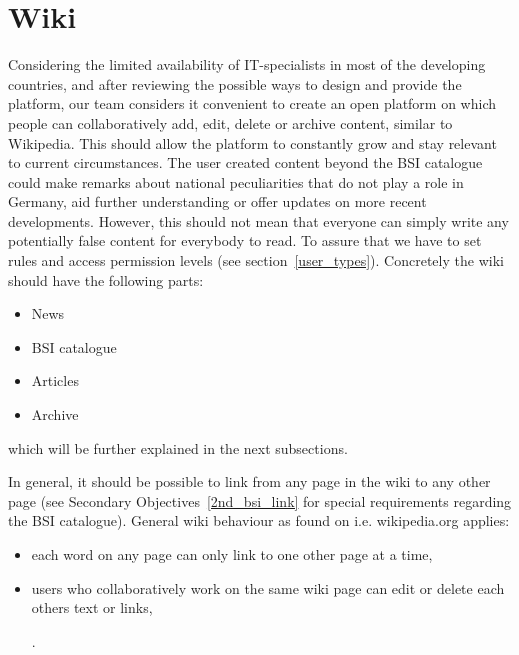 \section{Wiki} 
Considering the limited availability of IT-specialists in most of the developing countries, and after reviewing the possible ways to design and provide the platform, our team considers it convenient to create an open platform on which people can collaboratively add, edit, delete or archive content, similar to Wikipedia. 
This should allow the platform to constantly grow and stay relevant to current circumstances. 
The user created content beyond the BSI catalogue could make remarks about national peculiarities that do not play a role in Germany, aid further understanding or offer updates on more recent developments.
However, this should not mean that everyone can simply write any potentially false content for everybody to read. 
To assure that we have to set rules and access permission levels (see section~\ref{user_types}). 
Concretely the wiki should have the following parts:
\begin{itemize}
    \item News
    \item BSI catalogue
    \item Articles
    \item Archive
\end{itemize}
which will be further explained in the next subsections.
\begin{tcolorbox}[breakable,colback=red!12,colframe=red!40!black,title=UPDATE 15/11/2017]
In general, it should be possible to link from any page in the wiki to any other page (see Secondary Objectives~\ref{2nd_bsi_link} for special requirements regarding the BSI catalogue). 
General wiki behaviour as found on i.e. wikipedia.org applies:
\begin{itemize}
    \item each word on any page can only link to one other page at a time,
    \item users who collaboratively work on the same wiki page can edit or delete each others text or links,
        .
\end{itemize}
\end{tcolorbox}


